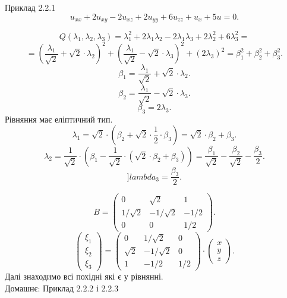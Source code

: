 Приклад 2.2.1
\[ u_{xx} + 2 u_{xy} - 2 u_{xz} + 2 u_{yy} + 6 u_{zz} + u_x + 5 u = 0. \]

\[ Q(\lambda_1, \lambda_2, \lambda_3) = \lambda_1^2 + 2\lambda_1 \lambda_2 - 2\lambda_1 \lambda_3 + 2\lambda_2^2 + 6\lambda_3^2 = \]
\[ = \left( \dfrac{\lambda_1}{\sqrt{2}} + \sqrt{2} \cdot \lambda_2\right)^2 + \left( \dfrac{\lambda_1}{\sqrt{2}} - \sqrt{2} \cdot \lambda_3\right)^2 + (2 \lambda_3)^2 = \beta_1^2 + \beta_2^2 + \beta_3^2. \]
\[ \beta_1 = \dfrac{\lambda_1}{\sqrt{2}} + \sqrt{2} \cdot \lambda_2. \]
\[ \beta_2 = \dfrac{\lambda_1}{\sqrt{2}} - \sqrt{2} \cdot \lambda_3. \]
\[ \beta_3 = 2 \lambda_3. \]
Рівняння має еліптичний тип.
\[ \lambda_1 = \sqrt{2} \cdot \left( \beta_2 + \sqrt{2} \cdot \dfrac 1 2 \cdot \beta_3 \right) = \sqrt{2} \cdot \beta_2 + \beta_3. \]
\[ \lambda_2 = \dfrac{1}{\sqrt{2}} \cdot \left( \beta_1 - \dfrac{1}{\sqrt{2}} \cdot (\sqrt{2} \cdot \beta_2 + \beta_3)\right) = \dfrac{\beta_1}{\sqrt{2}} - \dfrac{\beta_2}{\sqrt{2}} - \dfrac{\beta_3}{2}. \]
\[ ]lambda_3 = \dfrac{\beta_3}{2}. \]

\[ B = \begin{pmatrix} 0 & \sqrt{2} & 1 \\ 1 / \sqrt{2} & - 1 / \sqrt{2} & - 1 / 2 \\ 0 & 0 & 1 / 2 \end{pmatrix}. \]
\[ \begin{pmatrix} \xi_1 \\ \xi_2 \\ \xi_3 \end{pmatrix} = \begin{pmatrix} 0 & 1 / \sqrt{2} & 0 \\ \sqrt{2} & - 1 / \sqrt{2} & 0 \\ 1 & -1/2 & 1 / 2 \end{pmatrix} \cdot \begin{pmatrix} x \\ y \\ z \end{pmatrix}. \]
Далі знаходимо всі похідні які є у рівнянні. \\

Домашнє: Приклад 2.2.2 і 2.2.3
